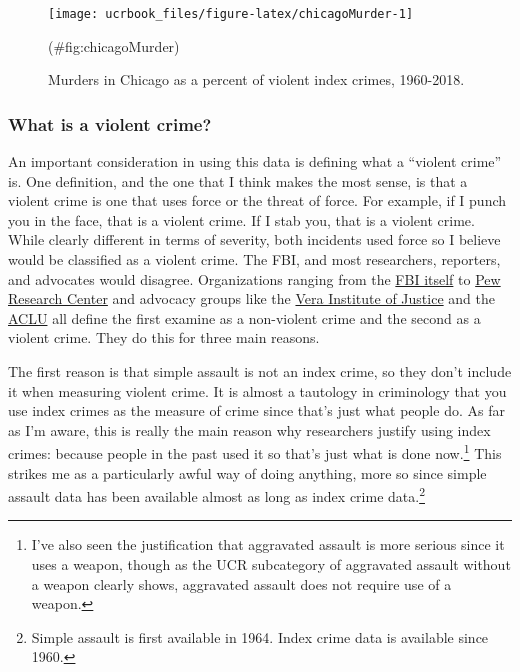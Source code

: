 \documentclass[
  12pt,
  openany]{book}
\begin{document}
\begin{figure}

{\centering \texttt{[image: ucrbook\_files/figure-latex/chicagoMurder-1]} 

}

\caption{Murders in Chicago as a percent of violent index crimes, 1960-2018.}(\#fig:chicagoMurder)
\end{figure}

\hypertarget{what-is-a-violent-crime}{%
\subsubsection{What is a violent crime?}\label{what-is-a-violent-crime}}

An important consideration in using this data is defining what a ``violent crime'' is. One definition, and the one that I think makes the most sense, is that a violent crime is one that uses force or the threat of force. For example, if I punch you in the face, that is a violent crime. If I stab you, that is a violent crime. While clearly different in terms of severity, both incidents used force so I believe would be classified as a violent crime. The FBI, and most researchers, reporters, and advocates would disagree. Organizations ranging from the \href{https://ucr.fbi.gov/crime-in-the-u.s/2019/crime-in-the-u.s.-2019/topic-pages/violent-crime}{FBI itself} to \href{https://www.pewresearch.org/fact-tank/2020/11/20/facts-about-crime-in-the-u-s/}{Pew Research Center} and advocacy groups like the \href{https://arresttrends.vera.org/data-sources-methodology}{Vera Institute of Justice} and the \href{https://www.aclu.org/report/tale-two-countries-racially-targeted-arrests-era-marijuana-reform}{ACLU} all define the first examine as a non-violent crime and the second as a violent crime. They do this for three main reasons.

The first reason is that simple assault is not an index crime, so they don't include it when measuring violent crime. It is almost a tautology in criminology that you use index crimes as the measure of crime since that's just what people do. As far as I'm aware, this is really the main reason why researchers justify using index crimes: because people in the past used it so that's just what is done now.\footnote{I've also seen the justification that aggravated assault is more serious since it uses a weapon, though as the UCR subcategory of aggravated assault without a weapon clearly shows, aggravated assault does not require use of a weapon.} This strikes me as a particularly awful way of doing anything, more so since simple assault data has been available almost as long as index crime data.\footnote{Simple assault is first available in 1964. Index crime data is available since 1960.}
\end{document}
